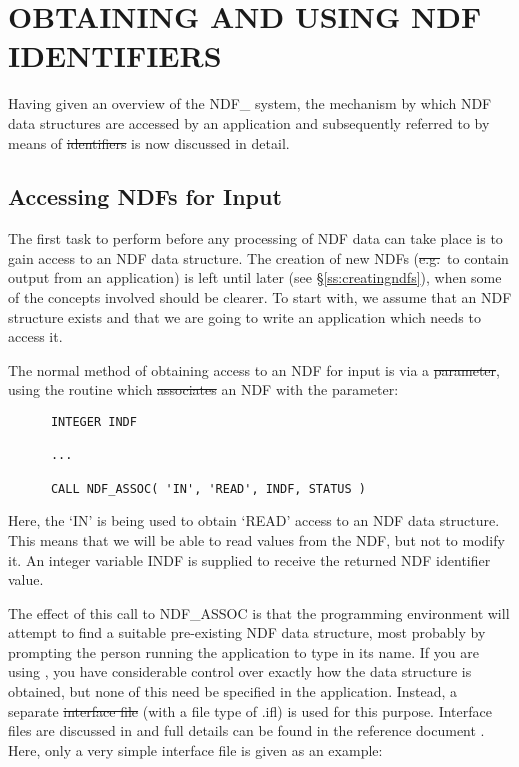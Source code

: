 \section{OBTAINING AND USING NDF IDENTIFIERS}

Having given an overview of the NDF\_ system, the mechanism by which NDF data
structures are accessed by an application and subsequently referred to by means
of \st{identifiers\/} is now discussed in detail. 

\subsection{\label{ss:associnput}Accessing NDFs for Input}

The first task to perform before any processing of NDF data can take place is
to gain access to an NDF data structure.
The creation of new NDFs (\st{e.g.}\ to contain output from an application)
is left until later (see \S\ref{ss:creatingndfs}), when some of the concepts
involved should be clearer. 
To start with, we assume that an NDF structure exists and that we are  going to
write an application which needs to access it.

The normal method of obtaining access to an NDF for input is via a
\st{parameter}, using the routine  which \st{associates\/}
an NDF with the parameter:

\small
\begin{verbatim}
      INTEGER INDF

      ...

      CALL NDF_ASSOC( 'IN', 'READ', INDF, STATUS )
\end{verbatim}
\normalsize

Here, the `IN' is being used to obtain `READ' access to an NDF data structure.
This means that we will be able to read values from the NDF, but not to
modify it.
An integer variable INDF is supplied to receive the returned NDF identifier 
value.

The effect of this call to NDF\_ASSOC is that the programming
environment will attempt to find a suitable pre-existing NDF data
structure, most probably by prompting the person running the
application to type in its name.
If you are using , you have considerable control over exactly how
the data structure is obtained, but none of this need be specified in
the application.
Instead, a separate \st{interface file\/} (with a file type of .ifl) is used
for this purpose.
Interface files are discussed in  and full
details can be found in the reference document .
Here, only a very simple interface file is given as an example:

